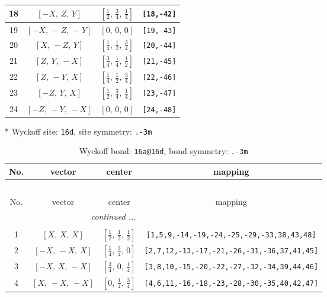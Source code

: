 \documentclass[fleqn,8pt]{jsarticle}
\begin{document}
\begin{longtable}{cccc}
18 & $\left[ - X,\, Z,\, Y \right]$ & $\left[ \frac{1}{2},\, \frac{3}{4},\, \frac{1}{4} \right]$ & {\tt [18,-42]} \\ \hline
19 & $\left[ - X,\, - Z,\, - Y \right]$ & $\left[ 0,\, 0,\, 0 \right]$ & {\tt [19,-43]} \\ \hline
20 & $\left[ X,\, - Z,\, Y \right]$ & $\left[ \frac{1}{4},\, \frac{1}{2},\, \frac{3}{4} \right]$ & {\tt [20,-44]} \\ \hline
21 & $\left[ Z,\, Y,\, - X \right]$ & $\left[ \frac{3}{4},\, \frac{1}{4},\, \frac{1}{2} \right]$ & {\tt [21,-45]} \\ \hline
22 & $\left[ Z,\, - Y,\, X \right]$ & $\left[ \frac{1}{4},\, \frac{1}{2},\, \frac{3}{4} \right]$ & {\tt [22,-46]} \\ \hline
23 & $\left[ - Z,\, Y,\, X \right]$ & $\left[ \frac{1}{2},\, \frac{3}{4},\, \frac{1}{4} \right]$ & {\tt [23,-47]} \\ \hline
24 & $\left[ - Z,\, - Y,\, - X \right]$ & $\left[ 0,\, 0,\, 0 \right]$ & {\tt [24,-48]} \\
\end{longtable}
* Wyckoff site: {\tt 16d}, site symmetry: {\tt .-3m}
\renewcommand{\arraystretch}{1.2}
\begin{longtable}{cccc}
\caption{Wyckoff bond: {\tt 16a@16d}, bond symmetry: {\tt .-3m}}
 \\
 \hline \hline
No. & vector & center & mapping \\ \hline \endfirsthead

\multicolumn{3}{l}{\tablename\ \thetable{}} \\
 \hline \hline
No. & vector & center & mapping \\ \hline \endhead

 \hline \hline
\multicolumn{3}{r}{\footnotesize\it continued ...} \\ \endfoot

 \hline \hline
\multicolumn{3}{r}{} \\ \endlastfoot

1 & $\left[ X,\, X,\, X \right]$ & $\left[ \frac{1}{2},\, \frac{1}{2},\, \frac{1}{2} \right]$ & {\tt [1,5,9,-14,-19,-24,-25,-29,-33,38,43,48]} \\ \hline
2 & $\left[ - X,\, - X,\, X \right]$ & $\left[ \frac{1}{4},\, \frac{3}{4},\, 0 \right]$ & {\tt [2,7,12,-13,-17,-21,-26,-31,-36,37,41,45]} \\ \hline
3 & $\left[ - X,\, X,\, - X \right]$ & $\left[ \frac{3}{4},\, 0,\, \frac{1}{4} \right]$ & {\tt [3,8,10,-15,-20,-22,-27,-32,-34,39,44,46]} \\ \hline
4 & $\left[ X,\, - X,\, - X \right]$ & $\left[ 0,\, \frac{1}{4},\, \frac{3}{4} \right]$ & {\tt [4,6,11,-16,-18,-23,-28,-30,-35,40,42,47]} \\
\end{longtable}
\end{document}

